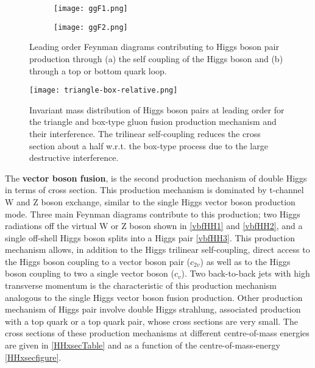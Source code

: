 \begin{figure*}[ht]
        \centering
        \begin{subfigure}[b]{0.475\textwidth}
            \centering
            \texttt{[image: ggF1.png]}
            \vspace{-0.5cm}
        \end{subfigure}
        \hspace{0.2cm}
        \begin{subfigure}[b]{0.475\textwidth}  
            \centering 
            \texttt{[image: ggF2.png]}
            \vspace{-0.5cm}
        \end{subfigure}
        \caption[]
        {\small Leading order Feynman diagrams contributing to Higgs boson pair production through (a) the self coupling of the Higgs boson and (b) through a top or bottom quark loop.}
        \label{ggF-HH}
\end{figure*}

\begin{figure}[ht]
	\centering
	\texttt{[image: triangle-box-relative.png]}
	\caption[Invariant mass distribution of Higgs boson pairs at leading order for the triangle and box-type gluon fusion production mechanism and their interference.]{Invariant mass distribution of Higgs boson pairs at leading order for the triangle and box-type gluon fusion production mechanism and their interference. The trilinear self-coupling reduces the cross section about a half w.r.t. the box-type process due to the large destructive interference\cite{DiMicco:2690841}.}
	\label{triangle-box-relative}
\end{figure}

The \textbf{vector boson fusion}, is the second production mechanism of double Higgs in terms of cross section. This production mechanism is dominated by t-channel W and Z boson exchange, similar to the single Higgs vector boson production mode. Three main Feynman diagrams contribute to this production; two Higgs radiations off the virtual W or Z boson shown in \autoref{vbfHH1} and \autoref{vbfHH2}, and a single off-shell Higgs boson splits into a Higgs pair \autoref{vbfHH3}. This production mechanism allows, in addition to the Higgs trilinear self-coupling, direct access to the Higgs boson coupling to a vector boson pair ($c_{2v}$) as well as to the Higgs boson coupling to two a single vector boson ($c_v$). Two back-to-back jets with high transverse momentum is the characteristic of this production mechanism analogous to the single Higgs vector boson fusion production. Other production mechanism of Higgs pair involve double Higgs strahlung, associated production with a top quark or a top quark pair, whose cross sections are very small. The cross sections of these production mechanisms at different centre-of-mass energies are given in \autoref{HHxsecTable} and as a function of the centre-of-mass-energy \autoref{HHxsecfigure}.

